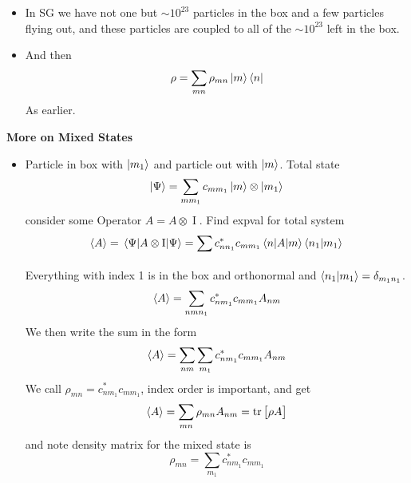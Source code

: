 \documentclass[11pt, a4paper]{article}
\newcommand{\II}{\operatorname{I}}  %
\begin{document}
\begin{itemize}
    \item In SG we have not one but $ \sim 10^{23} $ particles in the box and a few particles flying out, and these particles are coupled to all of the $ \sim 10^{23} $ left in the box.

    
    \item And then
    \begin{equation*}
        \rho = \sum_{mn} \rho_{mn} \ket{m}\bra{n}
    \end{equation*}
    As earlier. 
    
    
\end{itemize}

\textbf{More on Mixed States}
\begin{itemize}
    \item Particle in box with $ \ket{m_{1}} $ and particle out with $ \ket{m} $. Total state
    \begin{equation*}
        \ket{\Psi} = \sum_{mm_{1}}c_{mm_{1}} \ket{m}\otimes \ket{m_{1}}
    \end{equation*}
    consider some Operator $ A = A\otimes \II $. Find expval for total system
    \begin{equation*}
        \ev{A} = \mel{\Psi}{A\otimes \II}{\Psi} = \sum_{} c_{nn_{1}}^{*}c_{mm_{1}}\mel{n}{A}{m} \braket{n_{1}}{m_{1}}
    \end{equation*}
    Everything with index 1 is in the box and orthonormal and $ \braket{n_{1}}{m_{1}} = \delta_{m_{1}n_{1}} $.
    \begin{equation*}
        \ev{A} = \sum_{nm n_{1}} c_{nm_{1}}^{*} c_{mm_{1}} A_{nm}
    \end{equation*}
    We then write the sum in the form
    \begin{equation*}
        \ev{A} = \sum_{nm}\sum_{m_{1}} c_{nm_{1}}^{*} c_{mm_{1}}A_{nm}
    \end{equation*}
    We call $ \rho_{mn} = c_{nm_{1}}^{*} c_{mm_{1}} $, index order is important, and get
    \begin{equation*}
        \ev{A} = \sum_{mn}\rho_{mn}A_{nm} = \tr \big[\rho A \big]
    \end{equation*}
    and note density matrix for the mixed state is
    \begin{equation*}
        \rho_{mn} = \sum_{m_{1}}c_{nm_{1}}^{*} c_{mm_{1}}
    \end{equation*}
    

    
    
\end{itemize}
\end{document}
